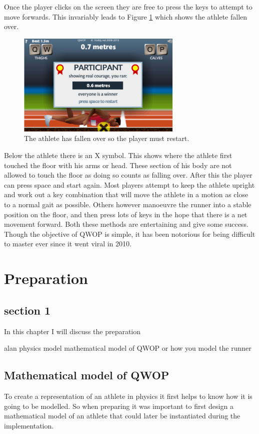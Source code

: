 \documentclass[12pt,a4paper,twoside,openright]{report}
\begin{document}
Once the player clicks on the screen they are free to press the keys to attempt to move forwards. This invariably leads to Figure \ref{fallen} which shows the athlete fallen over. 
\begin{figure}[htbp]
	\centering
	\includegraphics[width=0.7\textwidth]{qwopFallen.PNG}
	\caption{The athlete has fallen over so the player must restart.}
	\label{fallen}
\end{figure}
Below the athlete there is an X symbol. This shows where the athlete first touched the floor with his arms or head. These section of his body are not allowed to touch the floor as doing so counts as falling over. After this the player can press space and start again.
Most players attempt to keep the athlete upright and work out a key combination that will move the athlete in a motion as close to a normal gait as possible.
Others however manoeuvre the runner into a stable position on the floor, and then press lots of keys in the hope that there is a net movement forward.
Both these methods are entertaining and give some success.
Though the objective of QWOP is simple, it has been notorious for being difficult to master ever since it went viral in 2010.




\chapter{Preparation}
\section{section 1}

In this chapter I will discuss the preparation 

alan physics model
	mathematical model of QWOP
or 
how you model the runner

\section{Mathematical model of QWOP}
\label{mathModel}
To create a representation of an athlete in physics it first helps to know how it is going to be modelled. So when preparing it was important to first design a mathematical model of an athlete that could later be instantiated during the implementation.
\end{document}

